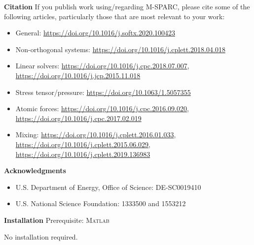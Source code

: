 \documentclass[xcolor=dvipsnames,t]{beamer}
\begin{document}
\begin{frame}[allowframebreaks]{\textbf{Citation}} \label{Citation}
If you publish work using/regarding M-SPARC, please cite some of the following articles, particularly those that are most relevant to your work:
\begin{itemize}
    \item General: \url{https://doi.org/10.1016/j.softx.2020.100423}
    \item Non-orthogonal systems: \url{https://doi.org/10.1016/j.cplett.2018.04.018}
    \item Linear solvers: \url{https://doi.org/10.1016/j.cpc.2018.07.007},    \url{https://doi.org/10.1016/j.jcp.2015.11.018}
    \item Stress tensor/pressure: \url{https://doi.org/10.1063/1.5057355}
    \item Atomic forces: \url{https://doi.org/10.1016/j.cpc.2016.09.020}, \url{https://doi.org/10.1016/j.cpc.2017.02.019}
    \item Mixing: \url{https://doi.org/10.1016/j.cplett.2016.01.033}, \url{https://doi.org/10.1016/j.cplett.2015.06.029}, \url{https://doi.org/10.1016/j.cplett.2019.136983}
\end{itemize}
\end{frame}



\begin{frame}[allowframebreaks]{\textbf{Acknowledgments}} \label{Acknowledgments}
  \begin{itemize}
      \item U.S. Department of Energy, Office of Science: DE-SC0019410
      \item U.S. National Science Foundation: 1333500 and 1553212
  \end{itemize}
  
\end{frame}



\begin{frame}{\textbf{Installation}} \label{Installation}
Prerequisite: \textsc{Matlab}

No installation required.
\end{frame}
\end{document}
